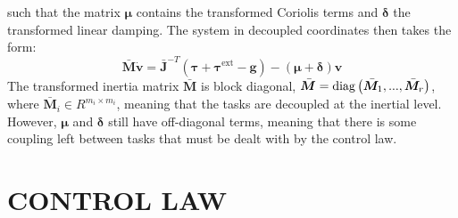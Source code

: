 \documentclass[../main.tex]{subfiles}
\begin{document}
such that the matrix $\bm{\mu}$ contains the transformed Coriolis terms and $\bm{\delta}$ the transformed linear damping. The system in decoupled coordinates then takes the form:
\begin{equation}
    \label{eq:UVMS_equation_decoupled}
    \bar{\bm{M}} \dot{\bm{v}}
    = \bar{\bm{J}}^{-T}(\bm{\tau}+ \bm{\tau}^{\text{ext}} - \bm{g})
    - (\bm{\mu} + \bm{\delta}) \bm{v}
\end{equation}
The transformed inertia matrix $\bar{\bm{M}}$ is block diagonal, $\bar{\bm{M}} = {\rm diag}\left(\bar{\bm{M}}_1, ..., \bar{\bm{M}}_r\right)$, where $\bar{\bm{M}}_i \in R^{m_i \times m_i}$, meaning that the tasks are decoupled at the inertial level. However, $\bm{\mu}$ and $\bm{\delta}$ still have off-diagonal terms, meaning that there is some coupling left between tasks that must be dealt with by the control law.

\section{CONTROL LAW}
\end{document}
